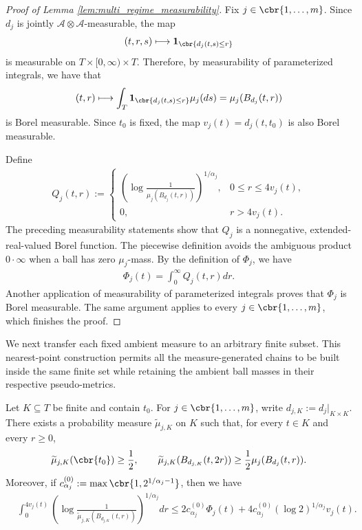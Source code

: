 \documentclass[11pt]{article}
\begin{document}
\begin{proof}[Proof of Lemma \ref{lem:multi_regime_measurability}]
Fix $j\in\cbr{1,\ldots,m}$. Since $d_j$ is jointly
$\mathcal A\otimes\mathcal A$-measurable, the map
\begin{align*}
(t,r,s)
\longmapsto
\mathbf 1_{\cbr{d_j(t,s)\le r}}
\end{align*}
is measurable on
$T\times[0,\infty)\times T$. Therefore, by measurability of
parameterized integrals, we have that
\begin{align*}
(t,r)
\longmapsto
\int_T
\mathbf 1_{\cbr{d_j(t,s)\le r}}\mu_j(ds)
=
\mu_j(B_{d_j}(t,r))
\end{align*}
is Borel measurable. Since $t_0$ is fixed, the map
$v_j(t)=d_j(t,t_0)$ is also Borel measurable.

Define
\begin{align*}
Q_j(t,r)
:=
\begin{cases}
\displaystyle
\left(
\log\frac{1}{\mu_j(B_{d_j}(t,r))}
\right)^{1/\alpha_j},
&0\le r\le4v_j(t),\\[1.2ex]
0,
&r>4v_j(t).
\end{cases}
\end{align*}
The preceding measurability statements show that $Q_j$ is a
nonnegative, extended-real-valued Borel function. The piecewise
definition avoids the ambiguous product $0\cdot\infty$ when a ball has
zero $\mu_j$-mass. By the definition of $\Phi_j$, we have
\begin{align*}
\Phi_j(t)
=
\int_0^\infty Q_j(t,r)dr.
\end{align*}
Another application of measurability of parameterized integrals proves
that $\Phi_j$ is Borel measurable. The same argument applies to every
$j\in\cbr{1,\ldots,m}$, which finishes the proof.
\end{proof}

We next transfer each fixed ambient measure to an arbitrary finite
subset. This nearest-point construction permits all the measure-generated
chains to be built inside the same finite set while retaining the ambient
ball masses in their respective pseudo-metrics.

\begin{lemma}
\label{lem:multi_regime_ambient_restriction}
Let $K\subseteq T$ be finite and contain $t_0$. For
$j\in\cbr{1,\ldots,m}$, write
$d_{j,K}:=d_j|_{K\times K}$. There exists a probability measure
$\widetilde\mu_{j,K}$ on $K$ such that, for every $t\in K$ and every
$r\ge0$,
\begin{align*}
\widetilde\mu_{j,K}(\cbr{t_0})
\ge\frac12,
\qquad
\widetilde\mu_{j,K}(B_{d_{j,K}}(t,2r))
\ge
\frac12\mu_j(B_{d_j}(t,r)).
\end{align*}
Moreover, if $c_{\alpha_j}^{(0)}:=
\max\cbr{1,2^{1/\alpha_j-1}}$,
then we have
\begin{align}
&\int_0^{4v_j(t)}
\left(
\log\frac{1}{
\widetilde\mu_{j,K}(B_{d_{j,K}}(t,r))
}
\right)^{1/\alpha_j}dr\le
2c_{\alpha_j}^{(0)}\Phi_j(t)
+
4c_{\alpha_j}^{(0)}
(\log2)^{1/\alpha_j}v_j(t).
\label{eq:multi_regime_ambient_integral_comparison}
\end{align}
\end{lemma}
\end{document}
